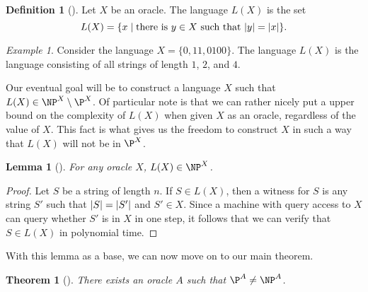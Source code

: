 \documentclass[english,12pt]{reedthesis}
\theoremstyle{plain}
\newtheorem{thm}{Theorem}[section]
\newtheorem{lemma}[lemma]{Lemma}
\theoremstyle{definition}
\newtheorem{defn}[defn]{Definition}
\theoremstyle{remark}
\newtheorem{example}{Example}[thm]
\DeclarePairedDelimiter{\abs}{\lvert}{\rvert}
\begin{document}
\begin{defn}[{\cite[436]{BGS75}}]\label{def:l(x)}
  Let $X$ be an oracle. The language $L(X)$ is the set
  \begin{equation*}
    L(X) = \{x \mid \text{there is } y \in X \text{ such that } \abs{y} = \abs{x}\}.
  \end{equation*}
\end{defn}

\begin{example}\label{ex:l(x)-simple}
  Consider the language $X = \{0, 11, 0100\}$. The language $L(X)$ is the
  language consisting of all strings of length $1$, $2$, and $4$.
\end{example}

Our eventual goal will be to construct a language $X$ such that
$L(X) \in \NP^{X} \setminus \P^{X}$. Of particular note is that we can rather nicely put a
upper bound on the complexity of $L(X)$ when given $X$ as an oracle, regardless
of the value of $X$. This fact is what gives us the freedom to construct $X$ in
such a way that $L(X)$ will not be in $\P^{X}$.

\begin{lemma}[{\cite[436]{BGS75}}]\label{lem:l(x)-in-np}
  For any oracle $X$, $L(X) \in \NP^{X}$.
\end{lemma}

\begin{proof}
  Let $S$ be a string of length $n$. If $S \in L(X)$, then a witness for $S$ is
  any string $S'$ such that $\abs{S} = \abs{S'}$ and $S' \in X$. Since a machine
  with query access to $X$ can query whether $S'$ is in $X$ in one step, it
  follows that we can verify that $S \in L(X)$ in polynomial time.
\end{proof}

With this lemma as a base, we can now move on to our main theorem.

\begin{thm}[{\cite[Theorem 3]{BGS75}}]\label{thm:p-np-nrel}
  There exists an oracle $A$ such that $\P^{A} \ne \NP^{A}$.
\end{thm}
\end{document}
